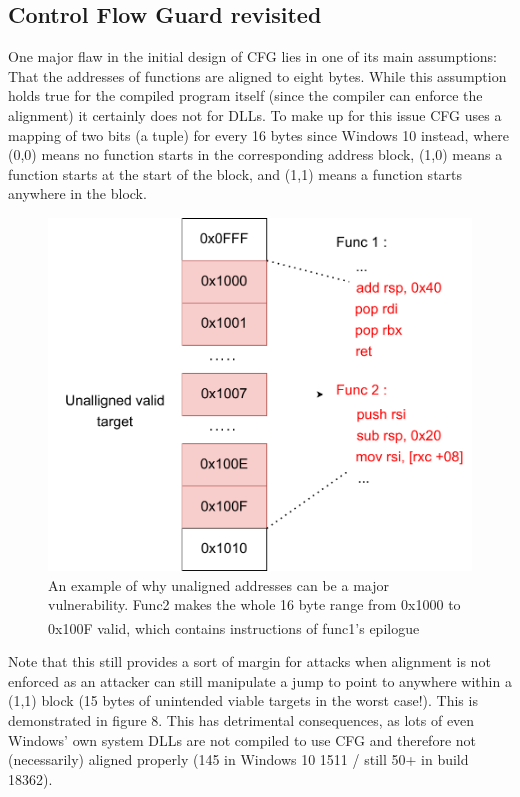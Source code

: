 \documentclass[10pt,twocolumn,a4paper]{article}
\begin{document}
\subsection{Control Flow Guard revisited}
One major flaw in the initial design of CFG lies in one of its main assumptions: That the addresses of functions are aligned to eight bytes.
While this assumption holds true for the compiled program itself (since the compiler can enforce the alignment) it certainly does not for DLLs.
To make up for this issue CFG uses a mapping of two bits (a tuple) for every 16 bytes since Windows 10 instead, where (0,0) means no function starts in the corresponding address block, (1,0) means a function starts at the start of the block, and (1,1) means a function starts anywhere in the block\cite{tuple}.
\begin{figure}[h]
	\includegraphics[keepaspectratio,width=\linewidth]{fig/unallignedcode}
	\caption{An example of why unaligned addresses can be a major vulnerability. Func2 makes the whole 16 byte range from 0x1000 to 0x100F valid, which contains instructions of func1's epilogue\textsuperscript{\cite{cfgexplore}}}
\end{figure}\newline
Note that this still provides a sort of margin for attacks when alignment is not enforced as an attacker can still manipulate a jump to point to anywhere within a (1,1) block (15 bytes of unintended viable targets in the worst case!).
This is demonstrated in figure 8.
This has detrimental consequences, as lots of even Windows' own system DLLs are not compiled to use CFG and therefore not (necessarily) aligned properly (145 in Windows 10 1511 / still 50+ in build 18362\cite{cfgbypass2}).
\end{document}

